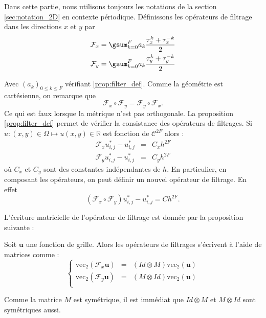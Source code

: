 Dans cette partie, nous utilisons toujours les notations de la section \ref{sec:notation_2D} en contexte périodique. Définissons les opérateurs de filtrage dans les directions $x$ et $y$ par
\begin{eqnarray*}
\mathcal{F}_x = \gsum_{k=0}^F a_k \dfrac{\tau_x^k + \tau_x^{-k}}{2} \\
\mathcal{F}_y = \gsum_{k=0}^F a_k \dfrac{\tau_y^k + \tau_y^{-k}}{2} \\
\end{eqnarray*}

Avec $(a_k)_{0 \leq k \leq F}$ vérifiant \ref{prop:filter_def}. Comme la géométrie est cartésienne, on remarque que 
\begin{equation}
\mathcal{F}_x \circ \mathcal{F}_y = \mathcal{F}_y \circ \mathcal{F}_x.
\end{equation}
Ce qui est faux lorsque la métrique n'est pas orthogonale.
La proposition \ref{prop:filter_def} permet de vérifier la consistance des opérateurs de filtrages.
Si $u : (x,y) \in \Omega \mapsto u(x,y) \in \mathbb{R}$ est fonction de $\mathcal{C}^{2F}$ alors :
\begin{eqnarray*}
\mathcal{F}_x u^*_{i,j} - u^*_{i,j} & = & C_xh^{2F}\\
\mathcal{F}_y u^*_{i,j} - u^*_{i,j} & = & C_yh^{2F}
\end{eqnarray*}
où $C_x$ et $C_y$ sont des constantes indépendantes de $h$.
En particulier, en composant les opérateurs, on peut définir un nouvel opérateur de filtrage. En effet  
\begin{equation}
(\mathcal{F}_x \circ \mathcal{F}_y) u_{i,j}^* - u_{i,j}^* = Ch^{2F}.
\end{equation}

L'écriture matricielle de l'opérateur de filtrage est donnée par la proposition suivante :
\begin{proposition}
Soit $\mathbf{u}$ une fonction de grille. Alors les opérateurs de filtrages s'écrivent à l'aide de matrices comme :
\begin{equation}
\left\lbrace
\begin{array}{rcl}
\text{vec}_2 (\mathcal{F}_x \mathbf{u}) & = & (Id \otimes M) \text{vec}_2 (\mathbf{u})\\
\text{vec}_2 (\mathcal{F}_y \mathbf{u}) & = & (M \otimes Id) \text{vec}_2 (\mathbf{u})\\
\end{array}
\right.
\end{equation}
\end{proposition}
Comme la matrice $M$ est symétrique, il est immédiat que $Id \otimes M$ et $M \otimes Id$ sont symétriques aussi.

